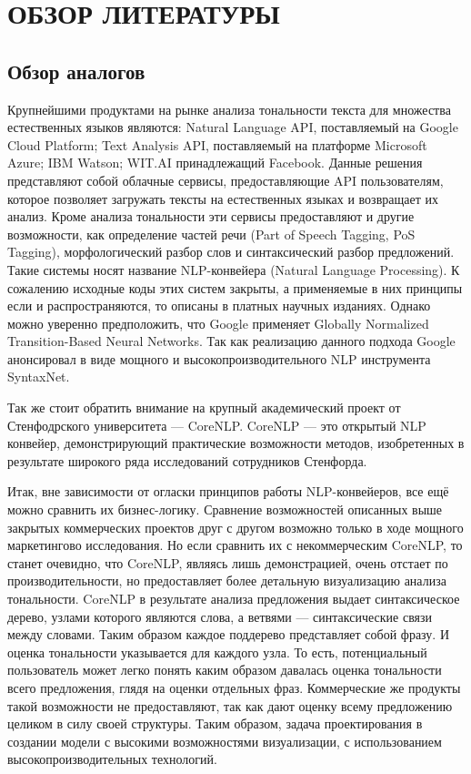 \section{ОБЗОР ЛИТЕРАТУРЫ}\label{sec:overview}
\subsection{Обзор аналогов}\label{subsec:overview:overview_analogue}
Крупнейшими продуктами на рынке анализа тональности текста для множества естественных языков являются: Natural Language API, поставляемый на Google Cloud Platform; Text Analysis API, поставляемый на платформе Microsoft Azure; IBM Watson; WIT.AI принадлежащий Facebook. Данные решения представляют собой облачные сервисы, предоставляющие API пользователям, которое позволяет загружать тексты на естественных языках и возвращает их анализ. Кроме анализа тональности эти сервисы предоставляют и другие возможности, как определение частей речи (Part of Speech Tagging, PoS Tagging), морфологический разбор слов и синтаксический разбор предложений. Такие системы носят название NLP-конвейера (Natural Language Processing). К сожалению исходные коды этих систем закрыты, а применяемые в них принципы если и распространяются, то описаны в платных научных изданиях. Однако можно уверенно предположить, что Google применяет Globally Normalized Transition-Based Neural Networks\cite{google_gntb}. Так как реализацию  данного подхода Google анонсировал в виде мощного и высокопроизводительного NLP инструмента SyntaxNet.

Так же стоит обратить внимание на крупный академический проект от Стенфодрского университета --- CoreNLP\@. CoreNLP --- это открытый NLP конвейер, демонстрирующий практические возможности методов, изобретенных в результате широкого ряда исследований сотрудников Стенфорда.

Итак, вне зависимости от огласки принципов работы NLP-конвейеров, все ещё можно сравнить их бизнес-логику. Сравнение возможностей описанных выше закрытых коммерческих проектов друг с другом возможно только в ходе мощного маркетингово исследования. Но если сравнить их с некоммерческим CoreNLP, то станет очевидно, что CoreNLP, являясь лишь демонстрацией, очень отстает по производительности, но предоставляет более детальную визуализацию анализа тональности. CoreNLP в результате анализа предложения выдает синтаксическое дерево, узлами которого являются слова, а ветвями --- синтаксические связи между словами. Таким образом каждое поддерево представляет собой фразу. И оценка тональности указывается для каждого узла. То есть, потенциальный пользователь может легко понять каким образом давалась оценка тональности всего предложения, глядя на оценки отдельных фраз. Коммерческие же продукты такой возможности не предоставляют, так как дают оценку всему предложению целиком в силу своей структуры. Таким образом, задача проектирования в создании модели с высокими возможностями визуализации, с использованием высокопроизводительных технологий.
